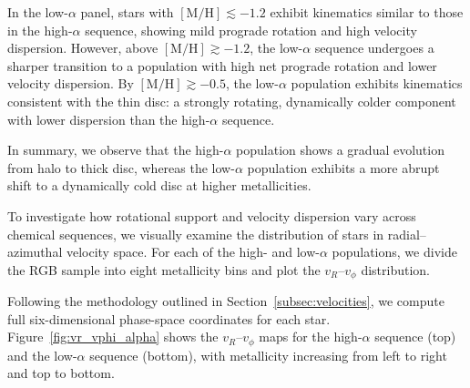 \documentclass[a4paper,12pt]{article}
\begin{document}
In the low-$\alpha$ panel, stars with $[\mathrm{M/H}]\lesssim -1.2$ exhibit kinematics similar 
to those in the high-$\alpha$ sequence, showing mild prograde rotation and high velocity dispersion. 
However, above $[\mathrm{M/H}]\gtrsim -1.2$, the low-$\alpha$ sequence 
undergoes a sharper transition to a population with high net prograde rotation and lower velocity dispersion. 
By $[\mathrm{M/H}]\gtrsim -0.5$, the low-$\alpha$ population exhibits kinematics consistent with the thin disc: 
a strongly rotating, dynamically colder component with lower dispersion than the high-$\alpha$ sequence.

In summary, we observe that the high-$\alpha$ population shows a gradual evolution from halo to thick disc, whereas the 
low-$\alpha$ population exhibits a more abrupt shift to a dynamically cold disc at higher metallicities.





To investigate how rotational support and velocity dispersion vary across chemical sequences, we visually 
examine the distribution of stars in radial–azimuthal velocity space.  For each of the high- and low-$\alpha$ 
populations, we divide the RGB sample into eight metallicity bins and plot the $v_R$–$v_\phi$ distribution.

Following the methodology outlined in Section~\ref{subsec:velocities}, we compute full six-dimensional 
phase-space coordinates for each star.  Figure~\ref{fig:vr_vphi_alpha} shows the $v_R$–$v_\phi$ maps for 
the high-$\alpha$ sequence (top) and the low-$\alpha$ sequence (bottom), with metallicity increasing from 
left to right and top to bottom.
\end{document}
